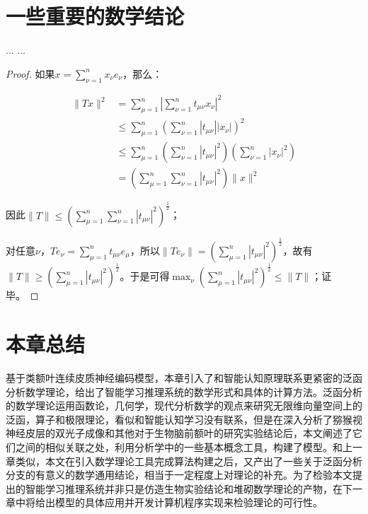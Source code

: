 \section{一些重要的数学结论}

... ...

\begin{proof}
如果$x=\sum_{\nu=1}^{n} x_{\nu} e_{\nu}$，那么：

$$ 
\begin{aligned}\|T x\|^{2} &=\sum_{\mu=1}^{n}\left|\sum_{\nu=1}^{n} t_{\mu \nu} x_{\nu}\right|^{2} \\ & \leqslant \sum_{\mu=1}^{n}\left(\sum_{\nu=1}^{n}\left|t_{\mu \nu}\right|\left|x_{\nu}\right|\right)^{2} \\& {\leqslant \sum_{\mu=1}^{n}\left(\sum_{\nu=1}^{n}\left|t_{\mu \nu}\right|^{2}\right)\left(\sum_{\nu=1}^{n}\left|x_{\nu}\right|^{2}\right)} \\& {=\left(\sum_{\mu=1}^{n} \sum_{\nu=1}^{n}\left|t_{\mu \nu}\right|^{2}\right)\|x\|^{2}}\end{aligned}
$$

因此$\|T\| \leqslant\left(\sum_{\mu=1}^{n} \sum_{\nu=1}^{n}\left|t_{\mu \nu}\right|^{2}\right)^{\frac{1}{2}}$；

对任意$\nu$，$T e_{\nu}=\sum_{\mu=1}^{n} t_{\mu \nu} e_{\mu}$，所以$\left\|T e_{\nu}\right\|=\left(\sum_{\mu=1}^{n}\left|t_{\mu \nu}\right|^{2}\right)^{\frac{1}{2}}$，故有$\|T\| \geqslant\left(\sum_{\mu=1}^{n}\left|t_{\mu \nu}\right|^{2}\right)^{\frac{1}{2}}$。于是可得$\max_{\nu} \left(\sum_{\mu=1}^{n}\left|t_{\mu \nu}\right|^{2}\right)^{\frac{1}{2}} \leqslant\|T\|$；证毕。
\end{proof}


\section{本章总结}
基于类额叶连续皮质神经编码模型，本章引入了和智能认知原理联系更紧密的泛函分析数学理论，给出了智能学习推理系统的数学形式和具体的计算方法。泛函分析的数学理论运用函数论，几何学，现代分析数学的观点来研究无限维向量空间上的泛函，算子和极限理论，看似和智能认知学习没有联系，但是在深入分析了猕猴视神经皮层的双光子成像和其他对于生物脑前额叶的研究实验结论后，本文阐述了它们之间的相似关联之处，利用分析学中的一些基本概念工具，构建了模型。和上一章类似，本文在引入数学理论工具完成算法构建之后，又产出了一些关于泛函分析分支的有意义的数学通用结论，相当于一定程度上对理论的补充。为了检验本文提出的智能学习推理系统并非只是仿造生物实验结论和堆砌数学理论的产物，在下一章中将给出模型的具体应用并开发计算机程序实现来检验理论的可行性。